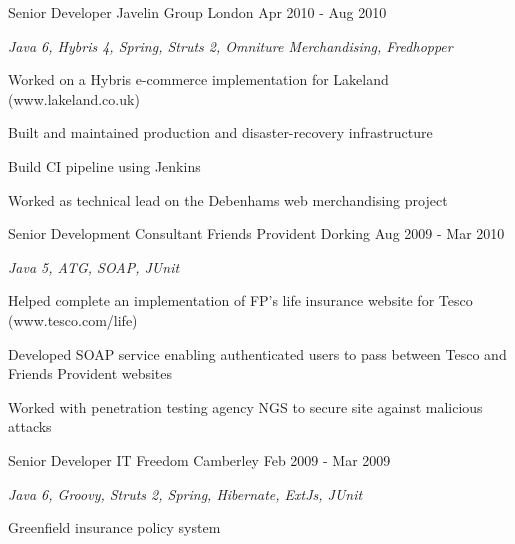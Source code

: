 \begin{cventries}
  \cventry
    {Senior Developer} %
    {Javelin Group} %
    {London} %
    {Apr 2010 - Aug 2010} %
    {
      \begin{cvitems} %
        \item {\itshape{Java 6, Hybris 4, Spring, Struts 2, Omniture Merchandising, Fredhopper}}
        \item {Worked on a Hybris e-commerce implementation for Lakeland (www.lakeland.co.uk)}
        \item {Built and maintained production and disaster-recovery infrastructure}
        \item {Build CI pipeline using Jenkins}
        \item {Worked as technical lead on the Debenhams web merchandising project}
      \end{cvitems}
    }
    

  \cventry
    {Senior Development Consultant} %
    {Friends Provident} %
    {Dorking} %
    {Aug 2009 - Mar 2010} %
    {
      \begin{cvitems} %
        \item {\itshape{Java 5, ATG, SOAP, JUnit}}
        \item {Helped complete an implementation of FP’s life insurance website for Tesco (www.tesco.com/life)}
        \item {Developed SOAP service enabling authenticated users to pass between Tesco and Friends Provident websites}
        \item {Worked with penetration testing agency NGS to secure site against malicious attacks}
      \end{cvitems}
    }

  \cventry
    {Senior Developer} %
    {IT Freedom} %
    {Camberley} %
    {Feb 2009 - Mar 2009} %
    {
      \begin{cvitems} %
        \item {\itshape{Java 6, Groovy, Struts 2, Spring, Hibernate, ExtJs, JUnit}}
        \item {Greenfield insurance policy system}
      \end{cvitems}
    }
    

\end{cventries}
